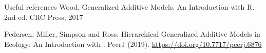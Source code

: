 \begin{block}{Useful references}
Wood. Generalized Additive Models. An Introduction with R. 2nd ed. CRC Press, 2017 \br

Pedersen, Miller, Simpson and Ross. Hierarchical Generalized Additive Models in Ecology: An Introduction with \mgcv. PeerJ (2019). \url{https://doi.org/10.7717/peerj.6876}

\end{block}
